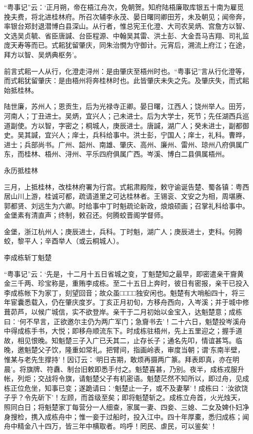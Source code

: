 \documentclass[]{article}
\begin{document}
``粤事记''云：`正月朔，帝在梧江舟次，免朝贺。知府陆梧廉取库银五十南为雇觅挽夫费，将北进桂林府。所召次辅李永茂、晏日曙同卿田芳，未及朝见；闻帝奔，率银台郑封退潜博白县深山。从行者，惟总宪王化澄、大司农吴炳、宫詹方以智、文选吴贞毓、省臣唐諴、台臣程源、中翰吴其雷、洪土彭、大金吾马吉翔、司礼监庞天寿等而已。式耜犹留肇庆，同朱治憪为守御计。元宵后，溯流上府江；在途，拜方以智、吴炳典枢务'。

前言式耜一人从行，化澄走浔州：是由肇庆至梧州时也。``粤事记''言从行化澄等，而式耜犹留肇庆：是由梧州将奔桂林时也。此皆肇庆未失之先。及肇庆失，而式耜始抵桂林。

陆世廉，苏州人；恩贡生，后为光禄寺正卿。晏日曙，江西人；饶州举人。田芳，河南人；丁丑进士。吴炳，宜兴人；己未进士。后为大学士，死节；先任湖西兵巡道副使。方以智，字密之；桐城人，庚辰进士。唐諴，湖广人；癸未进士，副都御史。吴其諴，宜兴人；庠士，兵科给事中。洪士彭，宁国人；庠士，礼科。曹晔，进士；兵部尚书。广州、韶州、南雄、肇庆、高州、廉州、雷州、琼州八府俱属广东，而桂林、梧州、浔州、平乐四府俱属广西。岑溪、博白二县俱属梧州。

永历抵桂林

三月，上抵桂林，改桂林府署为行宫。式耜肃殿陛，敕守谕诞告楚、蜀各镇：粤西居山川上游，桂诚可都，疏请道里之可达桂林者。王锡衮、文安之为相，周堪赓、郭都贤、刘远生为六卿。时给事中丁时魁疏论新政，烺烺硕画；召掌礼科给事中。金堡素有清直声；终制，敕召还。何腾蛟晋阁学督师。

金堡，浙江杭州人；庚辰进士，兵科。丁时魁，湖广人；庚辰进士，吏科。何腾蛟，黎平人；辛酉举人（或云桐城人）。

李成栋斩丁魁楚

``粤事记''云：`先是，十二月十五日省城之变，丁魁楚知之最早，即密遣亲干齎黄金三千两、珍宝称是，重贿李成栋。至二十五日上奔时，彼日有密报，亲干已投入李成栋帐下为家丁，刻望回音；故众虽□□□□独安闲也。魁楚有大哨船四十，将三年宦囊悉载入，仍在肇庆度岁。丁亥正月初旬，方移舟西向，入岑溪；并于城中修葺茆芦，以候广城信，实不欲登岸。亲干于二月初始以金宝入，达魁楚意；成栋曰：`何不早言，正欲邀尔主仍为两广军门；急齎书去'！二十六日，魁楚投岑溪舟中得成栋手书，大悦；即移舟顺流东下。时成栋驻梧州，先上五里迎之；握手道故，相见恨晚。知魁楚三子入广已夭其二，止存长子；通名先叩，情谊甚笃。临晚，邀魁楚父子饮，隆重如常礼。把臂间，指画岭表，审度当朝；谓`东南半壁，惟某与老先生撑持'！因订云：`明日吉期，敢烦再摄两广篆。拜表即真，亦在明晨'。将旗牌、符纛、制台旧敕即悉手付之。魁楚喜甚，乃别。夜半，成栋戎服升帐，列炬；交战将令旗，请魁楚父子有机密语。魁楚茫然不知所以，即过舟，见成栋正位危坐，知事已变；遂跪请曰：`魁楚止一子，或不及妻拏'！成栋曰：`汝欲饶子乎？令先斫下'！左顾，而首级至矣；即将魁楚斩之。成栋立舟首，火光烛天，照同白日；将魁楚家丁每营分一人细查，家属一妻、四妾、三媳、二女及婢仆妇净身搜检，携入成栋舟中；惟一妾于过船时，投入江中。四十年厚橐，悉归成栋；闻舟中精金八十四万，皆三年中横取者。呜呼！罔民、虐民，可以鉴矣'！
\end{document}
